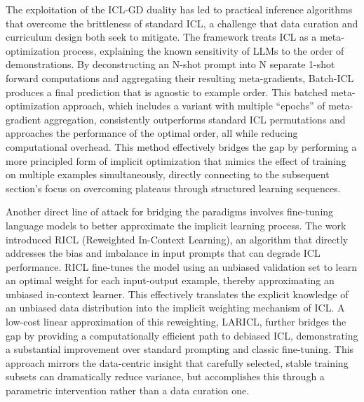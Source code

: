 \documentclass[11pt]{article}
\begin{document}
The exploitation of the ICL-GD duality has led to practical inference algorithms that overcome the brittleness of standard ICL, a challenge that data curation and curriculum design both seek to mitigate. The \cite{ref197} framework treats ICL as a meta-optimization process, explaining the known sensitivity of LLMs to the order of demonstrations. By deconstructing an N-shot prompt into N separate 1-shot forward computations and aggregating their resulting meta-gradients, Batch-ICL produces a final prediction that is agnostic to example order. This batched meta-optimization approach, which includes a variant with multiple ``epochs'' of meta-gradient aggregation, consistently outperforms standard ICL permutations and approaches the performance of the optimal order, all while reducing computational overhead. This method effectively bridges the gap by performing a more principled form of implicit optimization that mimics the effect of training on multiple examples simultaneously, directly connecting to the subsequent section's focus on overcoming plateaus through structured learning sequences.

Another direct line of attack for bridging the paradigms involves fine-tuning language models to better approximate the implicit learning process. The \cite{ref198} work introduced RICL (Reweighted In-Context Learning), an algorithm that directly addresses the bias and imbalance in input prompts that can degrade ICL performance. RICL fine-tunes the model using an unbiased validation set to learn an optimal weight for each input-output example, thereby approximating an unbiased in-context learner. This effectively translates the explicit knowledge of an unbiased data distribution into the implicit weighting mechanism of ICL. A low-cost linear approximation of this reweighting, LARICL, further bridges the gap by providing a computationally efficient path to debiased ICL, demonstrating a substantial improvement over standard prompting and classic fine-tuning. This approach mirrors the data-centric insight that carefully selected, stable training subsets can dramatically reduce variance, but accomplishes this through a parametric intervention rather than a data curation one.
\end{document}
